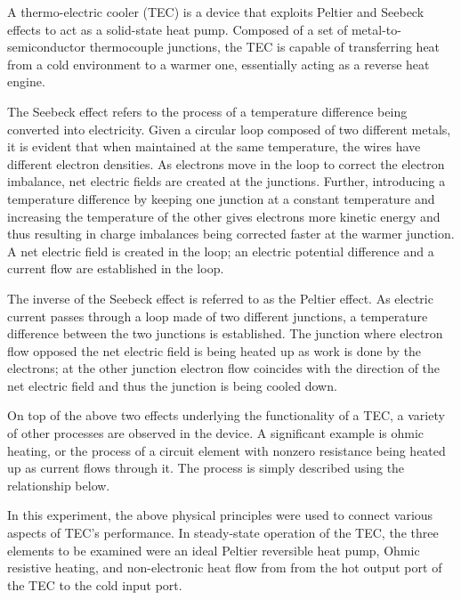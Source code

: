 \begin{paper}
	
	
	A thermo-electric cooler (TEC) is a device that exploits Peltier and Seebeck effects to act as a solid-state heat pump. Composed of a set of metal-to-semiconductor thermocouple junctions, the TEC is capable of transferring heat from a cold environment to a warmer one, essentially acting as a reverse heat engine. 
	
	The Seebeck effect refers to the process of a temperature difference being converted into electricity. Given a circular loop composed of two different metals, it is evident that when maintained at the same temperature, the wires have different electron densities. As electrons move in the loop to correct the electron imbalance, net electric fields are created at the junctions. Further, introducing a temperature difference by keeping one junction at a constant temperature and increasing the temperature of the other gives electrons more kinetic energy and thus resulting in charge imbalances being corrected faster at the warmer junction. A net electric field is created in the loop; an electric potential difference and a current flow are established in the loop.
	
	The inverse of the Seebeck effect is referred to as the Peltier effect. As electric current passes through a loop made of two different junctions, a temperature difference between the two junctions is established. The junction where electron flow opposed the net electric field is being heated up as work is done by the electrons; at the other junction electron flow coincides with the direction of the net electric field and thus the junction is being cooled down. 
	
	On top of the above two effects underlying the functionality of a TEC, a variety of other processes are observed in the device. A significant example is ohmic heating, or the process of a circuit element with nonzero resistance being heated up as current flows through it. The process is simply described using the relationship below. 
	
	\begin{paperwhere}
	\end{paperwhere}

	In this experiment, the above physical principles were used to connect various aspects of TEC's performance. In steady-state operation of the TEC, the three elements to be examined were an ideal Peltier reversible heat pump, Ohmic resistive heating, and non-electronic heat flow from from the hot output port of the TEC to the cold input port.
	

\end{paper}

